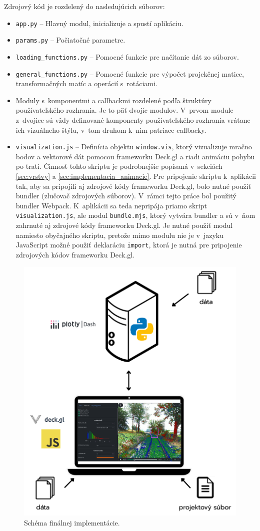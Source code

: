 Zdrojový kód je rozdelený do nasledujúcich súborov:
\begin{itemize}
    \item \texttt{app.py} -- Hlavný modul, inicializuje a spustí aplikáciu.
    \item \texttt{params.py} -- Počiatočné parametre.
    \item \texttt{loading\_functions.py} -- Pomocné funkcie pre načítanie dát zo súborov.
    \item \texttt{general\_functions.py} -- Pomocné funkcie pre výpočet projekčnej matice, transformačných matíc a operácií s~rotáciami.
    \item Moduly s~komponentmi a callbackmi rozdelené podľa štruktúry používateľského rozhrania. Je to päť dvojíc modulov. V~prvom module z~dvojice sú vždy definované komponenty používateľského rozhrania vrátane ich vizuálneho štýlu, v~tom druhom k~nim patriace callbacky.
    \item \texttt{visualization.js} -- Definícia objektu \texttt{window.vis}, ktorý vizualizuje mračno bodov a vektorové dát pomocou frameworku Deck.gl a riadi animáciu pohybu po trati. Činnosť tohto skriptu je podrobnejšie popísaná v~sekciách \ref{sec:vrstvy} a \ref{sec:implementacia_animacie}. Pre pripojenie skriptu k~aplikácii tak, aby sa pripojili aj zdrojové kódy frameworku Deck.gl, bolo nutné použiť bundler (zlučovač zdrojových súborov). V~rámci tejto práce bol použitý bundler Webpack. K~aplikácii sa teda nepripája priamo skript \texttt{visualization.js}, ale modul \texttt{bundle.mjs}, ktorý vytvára bundler a sú v~ňom zahrnuté aj zdrojové kódy frameworku Deck.gl. Je nutné použiť modul namiesto obyčajného skriptu, pretože mimo modulu nie je v~jazyku JavaScript možné použiť deklaráciu \texttt{import}, ktorá je nutná pre pripojenie zdrojových kódov frameworku Deck.gl. 
\end{itemize}

\begin{figure}[t]
    \centering
    \includegraphics[width=0.7\linewidth]{text_prace/obrazky-figures/schema_implementacie.pdf}
    \caption{Schéma finálnej implementácie.}
    \label{fig:schema_implementacie}
\end{figure}

